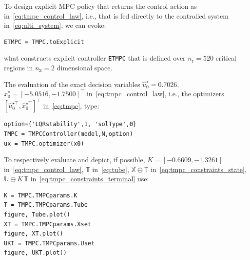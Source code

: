 \documentclass[letterpaper, 10 pt, conference]{ieeeconf}
\begin{document}
%

To design explicit MPC policy that returns the control action as in~\eqref{eq:tmpc_control_law}, i.e., that is fed directly to the controlled system in~\eqref{eq:ulti_system}, we can evoke:
\begin{lstlisting}[style=Matlab-editor]
ETMPC = TMPC.toExplicit
\end{lstlisting}
what constructs explicit controller \verb|ETMPC| that is defined over $n_\text{r} = 520$ critical regions in $n_\text{x} = 2$ dimensional space.


The evaluation of the exact decision variables $\hat{u}_{0}^{\star} = 0.7026$, $\hat{x}_{0}^{\star} = [-5.0516, -1.7500]^{\top}$ in~\eqref{eq:tmpc_control_law}, i.e., the optimizers $\left[ \hat{u}_{0}^{\star\top}, \hat{x}_{0}^{\star\top} \right]^{\top}$ in~\eqref{eq:tmpc}, type:
\begin{lstlisting}[style=Matlab-editor]
option={'LQRstability',1, 'solType',0}
TMPC = TMPCController(model,N,option)
ux = TMPC.optimizer(x0)
\end{lstlisting}
To respectively evaluate and depict, if possible, $K = [-0.6609, -1.3261]$ in~\eqref{eq:tmpc_control_law}, $\mathbb{T}$ in~\eqref{eq:tube}, $\mathbb{X} \ominus \mathbb{T}$ in~\eqref{eq:tmpc_constraints_state}, $\mathbb{U} \ominus K \, \mathbb{T}$ in~\eqref{eq:tmpc_constraints_terminal} use:
\begin{lstlisting}[style=Matlab-editor]
K = TMPC.TMPCparams.K
T = TMPC.TMPCparams.Tube
figure, Tube.plot()
XT = TMPC.TMPCparams.Xset
figure, XT.plot()
UKT = TMPC.TMPCparams.Uset
figure, UKT.plot()
\end{lstlisting}
\end{document}
